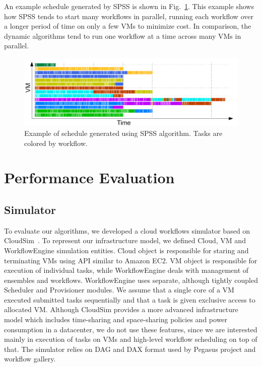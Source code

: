 \documentclass{sig-alternate}
\begin{document}
An example schedule generated by SPSS is shown in Fig.~\ref{fig:spss-example}.
This example shows how SPSS tends to start many workflows in parallel, running
each workflow over a longer period of time on only a few VMs to minimize cost. 
In comparison, the dynamic algorithms tend to run one workflow at a time across 
many VMs in parallel.

\begin{figure}[htb] 
\centering
\includegraphics[width=1.0\columnwidth]{figures/spss-gantt}
 \caption{Example of schedule generated using SPSS algorithm. Tasks are colored by workflow. }
\label{fig:spss-example}
\end{figure}


\section{Performance Evaluation}
\label{sec:performance}

\subsection{Simulator}

To evaluate our algorithms, we developed a cloud workflows simulator based on
CloudSim~\cite{Calheiros11}. To represent our infrastructure model, we defined
Cloud, VM and WorkflowEngine simulation entities. Cloud object is responsible
for staring and terminating VMs using API similar to Amazon EC2. VM object is
responsible for execution of individual tasks, while WorkflowEngine deals with
management of ensembles and workflows. WorkflowEngine uses separate, although
tightly coupled Scheduler and Provisioner modules. We assume that a single core
of a VM executed submitted tasks sequentially and that a task is given exclusive
access to allocated VM. Although CloudSim provides a more advanced
infrastructure model which includes time-sharing and space-sharing policies and
power consumption in a datacenter, we do not use these features, since we are
interested mainly in execution of tasks on VMs and high-level workflow scheduling
on top of that. The simulator relies on DAG and DAX format used by Pegasus
project and workflow gallery.
\end{document}
